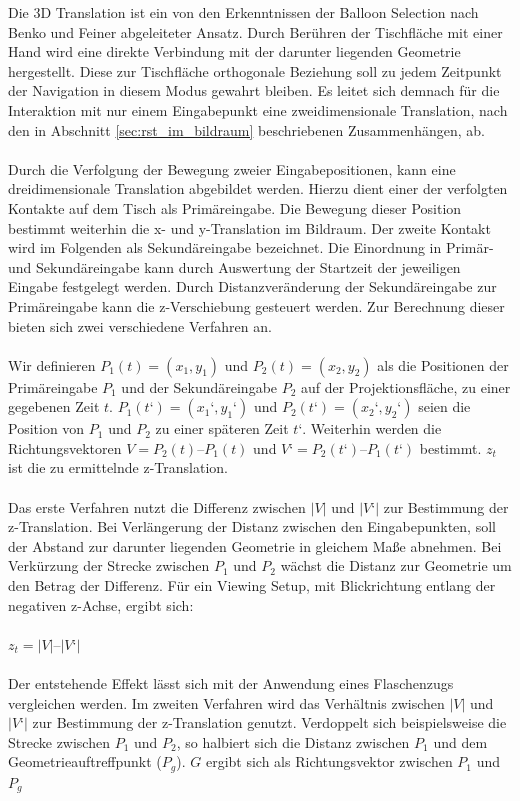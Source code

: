 Die 3D Translation ist ein von den Erkenntnissen der Balloon Selection nach Benko und Feiner \cite{benko:2007} abgeleiteter Ansatz. Durch \linebreak Berühren  der Tischfläche mit einer Hand wird eine direkte Verbindung mit der darunter liegenden Geometrie hergestellt. Diese zur Tischfläche orthogonale Beziehung soll zu jedem Zeitpunkt der Navigation in diesem Modus gewahrt bleiben. Es leitet sich demnach für die Interaktion mit nur einem Eingabepunkt eine zweidimensionale Translation, nach den in Abschnitt \ref{sec:rst_im_bildraum} beschriebenen Zusammenhängen, ab.
\\\\
Durch die Verfolgung der Bewegung zweier Eingabepositionen, kann eine dreidimensionale Translation abgebildet werden. Hierzu dient einer der verfolgten Kontakte auf dem Tisch als Primäreingabe. Die Bewegung dieser Position bestimmt weiterhin die x- und y-Translation im Bildraum. Der zweite Kontakt wird im Folgenden als Sekundäreingabe bezeichnet. Die Einordnung in Primär- und Sekundäreingabe kann durch Auswertung der Startzeit der jeweiligen Eingabe festgelegt werden. Durch Distanzveränderung der Sekundäreingabe zur Primäreingabe kann die z-Verschiebung gesteuert werden. Zur Berechnung dieser bieten sich zwei verschiedene Verfahren an.
\\\\
Wir definieren $P_1(t) = (x_1, y_1)$ und $P_2(t) = (x_2, y_2)$ als die Positionen der Primäreingabe $P_1$ und der Sekundäreingabe $P_2$ auf der Projektionsfläche, zu einer gegebenen Zeit $t$. $P_1(t‘) = (x_1‘, y_1‘)$ und $P_2(t‘) = (x_2‘, y_2‘)$  seien die Position von $P_1$ und $P_2$ zu einer späteren Zeit $t‘$. Weiterhin werden die Richtungsvektoren $V = P_2(t) – P_1(t)$ und $V‘ = P_2(t‘) – P_1(t‘)$ bestimmt. $z_t$ ist die zu ermittelnde z-Translation.
\\\\
Das erste Verfahren nutzt die Differenz zwischen $|V|$ und $|V‘|$ zur Bestimmung der z-Translation. Bei Verlängerung der Distanz zwischen den Eingabepunkten, soll der Abstand zur darunter liegenden Geometrie in gleichem Maße abnehmen. Bei Verkürzung der Strecke zwischen $P_1$ und $P_2$ wächst die Distanz zur Geometrie um den Betrag der Differenz. Für ein Viewing Setup, mit Blickrichtung entlang der negativen z-Achse, ergibt sich:
\\\\
$z_t = |V| – |V‘|$
\\\\
Der entstehende Effekt lässt sich mit der Anwendung eines Flaschenzugs vergleichen werden. Im zweiten Verfahren wird das Verhältnis zwischen $|V|$ und $|V‘|$ zur Bestimmung der z-Translation genutzt. Verdoppelt sich beispielsweise die Strecke zwischen $P_1$ und $P_2$, so halbiert sich die Distanz zwischen $P_1$ und dem Geometrieauftreffpunkt ($P_g$). $G$ ergibt sich als Richtungsvektor zwischen $P_1$ und $P_g$
